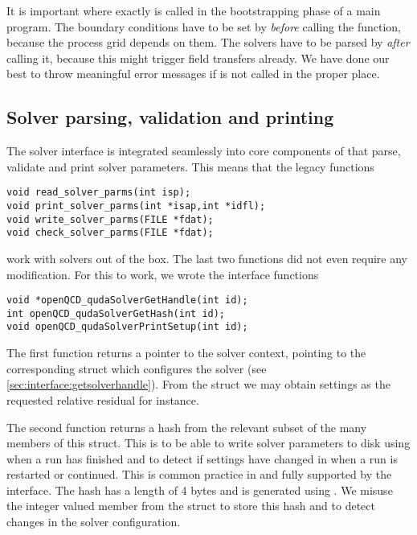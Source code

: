 It is important where exactly  is called in the bootstrapping phase of a main program.
The boundary conditions have to be set by  \emph{before} calling the function, because the process grid depends on them.
The solvers have to be parsed by  \emph{after} calling it, because this might trigger field transfers already.
We have done our best to throw meaningful error messages if  is not called in the proper place.

\subsection{Solver parsing, validation and printing}
\label{sec:interface:legacy}

The \quda solver interface is integrated seamlessly into core components of \openqxd that parse, validate and print solver parameters.
This means that the legacy functions
\begin{verbatim}
void read_solver_parms(int isp);
void print_solver_parms(int *isap,int *idfl);
void write_solver_parms(FILE *fdat);
void check_solver_parms(FILE *fdat);
\end{verbatim}
work with \quda solvers out of the box.
The last two functions did not even require any modification.
For this to work, we wrote the interface functions
\begin{verbatim}
void *openQCD_qudaSolverGetHandle(int id);
int openQCD_qudaSolverGetHash(int id);
void openQCD_qudaSolverPrintSetup(int id);
\end{verbatim}

The first function returns a pointer to the solver context, \ie pointing to the corresponding  struct which configures the solver (see \cref{sec:interface:getsolverhandle}).
From the struct we may obtain settings as the requested relative residual for instance.

The second function returns a hash from the relevant subset of the many members of this struct.
This is to be able to write \quda solver parameters to disk using  when a run has finished and to detect if settings have changed in  when a run is restarted or continued.
This is common practice in \openqxd and fully supported by the interface.
The hash has a length of \num{4} bytes and is generated using .
We misuse the integer valued member  from the  struct to store this hash and to detect changes in the solver configuration.

